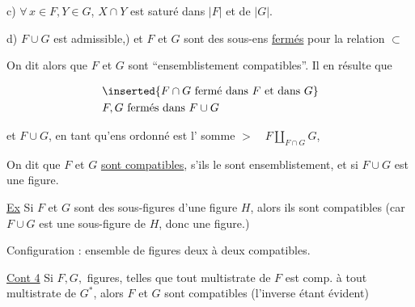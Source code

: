c) $\forall\,x\in F,Y\in G$, $X\cap Y$ est saturé dans $|F|$ et de $|G|$. 

d) $F\cup G$ est admissible,) et $F$ et $G$ sont des sous-ens  \uline{fermés} pour la relation $\subset$

On dit alors que  $F$ et $G$ sont ``ensemblistement compatibles''. Il en résulte que

\[
\begin{aligned}
&\relax\inserted{F\cap G\ \text{fermé dans } F \text{ et dans } G}\\
&F,G\ \text{fermés dans } F\cup G
\end{aligned}
\]

et $F\cup G$, en tant qu'ens  ordonné est l'  somme  $>\quad F\amalg_{F\cap G}G$,


On dit que $F$ et $G$ \uline{sont compatibles},  s'ils le sont ensemblistement, et si $F\cup G$ est une figure. 

\uline{Ex} Si $F$ et $G$ sont des sous-figures d'une figure $H$, alors ils sont compatibles (car  $F\cup G$ est une sous-figure de $H$, donc une figure.)

Configuration : ensemble de figures deux à deux compatibles.

\uline{Cont 4} Si $F,G,$  figures, telles que tout multistrate de $F$ est comp. à tout multistrate de $G^{*}$, alors $F$ et $G$ sont compatibles (l'inverse étant évident)

